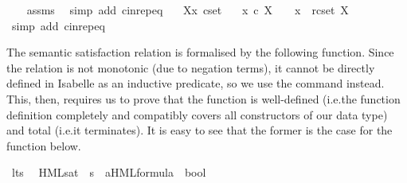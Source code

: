 \begin{isabellebody}
%
\isadelimproof
\ \ %
\endisadelimproof
%
\isatagproof
{}\isamarkupfalse%
\ assms\ \isamarkupfalse%
\ {\isacharparenleft}{\kern0pt}simp\ add{\isacharcolon}{\kern0pt}\ cin{\isachardot}{\kern0pt}rep{\isacharunderscore}{\kern0pt}eq{\isacharparenright}{\kern0pt}%
\endisatagproof
{\isafoldproof}%
%
\isadelimproof
\isanewline
%
\endisadelimproof
{}\isamarkupfalse%
\isanewline
\ \ \ X{\isacharcolon}{\kern0pt}{\isacharcolon}{\kern0pt}{\isacartoucheopen}{\isacharprime}{\kern0pt}x\ cset{\isacartoucheclose}\isanewline
\ \ \ {\isacartoucheopen}x\ {\isasymin}\isactrlsub c\ X\ \ {\isasymLongleftrightarrow}\ \ x\ {\isasymin}\ rcset\ X{\isacartoucheclose}\ \isanewline
%
\isadelimproof
\ \ %
\endisadelimproof
%
\isatagproof
{}\isamarkupfalse%
\ {\isacharparenleft}{\kern0pt}simp\ add{\isacharcolon}{\kern0pt}\ cin{\isachardot}{\kern0pt}rep{\isacharunderscore}{\kern0pt}eq{\isacharparenright}{\kern0pt}%
\endisatagproof
{\isafoldproof}%
%
\isadelimproof
%
\endisadelimproof
%
\isadelimdocument
%
\endisadelimdocument
%
\isatagdocument
%
\isamarkuptrue%
%
\endisatagdocument
{\isafolddocument}%
%
\isadelimdocument
%
\endisadelimdocument
%
\begin{isamarkuptext}%
The semantic satisfaction relation is formalised by the following function. Since the relation is not monotonic (due to negation terms), it cannot be directly defined in Isabelle as an inductive predicate, so we use the  command instead. This, then, requires us to prove that the function is well-defined (i.e.\@ the function definition completely and compatibly covers all constructors of our data type) and total (i.e.\@ it terminates). It is easy to see that the former is the case for the function below.%
\end{isamarkuptext}\isamarkuptrue%
\isamarkupfalse%
\ lts\ \isanewline
\isanewline
{}\isamarkupfalse%
\ HML{\isacharunderscore}{\kern0pt}sat\ {\isacharcolon}{\kern0pt}{\isacharcolon}{\kern0pt}\ {\isacartoucheopen}{\isacharprime}{\kern0pt}s\ {\isasymRightarrow}\ {\isacharparenleft}{\kern0pt}{\isacharprime}{\kern0pt}a{\isacharparenright}{\kern0pt}HML{\isacharunderscore}{\kern0pt}formula\ {\isasymRightarrow}\ bool{\isacartoucheclose}\ \isanewline
\ \ {\isacharparenleft}{\kern0pt}{\isacartoucheopen}{\isacharunderscore}{\kern0pt}\ {\isasymTurnstile}\ {\isacharunderscore}{\kern0pt}{\isacartoucheclose}\ {\isacharbrackleft}{\kern0pt}{}{}{\isacharcomma}{\kern0pt}\ {}{}{\isacharbrackright}{\kern0pt}\ {}{}{\isacharparenright}{\kern0pt}\isanewline

\end{isabellebody}
